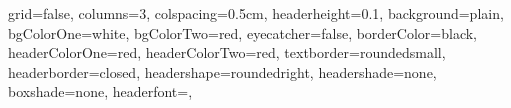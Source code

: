 \documentclass[a0paper,landscape]{baposter}
\begin{document}
\begin{poster}{
grid=false,
columns=3,
colspacing=0.5cm,
headerheight=0.1\textheight,
background=plain,
bgColorOne=white,
bgColorTwo=red,
eyecatcher=false,
borderColor=black,
headerColorOne=red,
headerColorTwo=red,
textborder=roundedsmall,
headerborder=closed,
headershape=roundedright,
headershade=none,
boxshade=none,
headerfont=\sc,
}
\end{poster}
\end{document}
